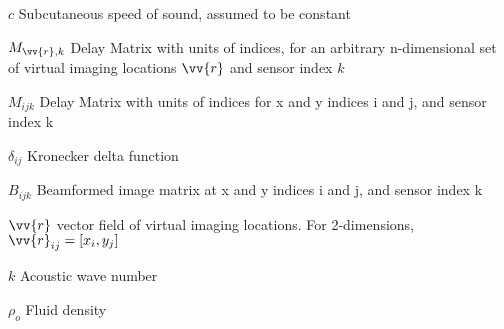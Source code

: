 \begin{eqlist}

\item[$c$] Subcutaneous speed of sound, assumed to be constant

\item[$M_{\vv{r},k}$] Delay Matrix with units of indices, for an arbitrary n-dimensional set of virtual imaging locations $\vv{r}$ and sensor index $k$

\item[$M_{ijk}$] Delay Matrix with units of indices for x and y indices i and j, and sensor index k

\item[$\delta_{ij}$] Kronecker delta function

\item[$B_{ijk}$] Beamformed image matrix at x and y indices i and j, and sensor index k

\item[$\vv{r}$] vector field of virtual imaging locations. For 2-dimensions, $\vv{r}_{ij} = [x_i, y_j]$

\item[$k$] Acoustic wave number

\item[$\rho_o$] Fluid density

\end{eqlist}

